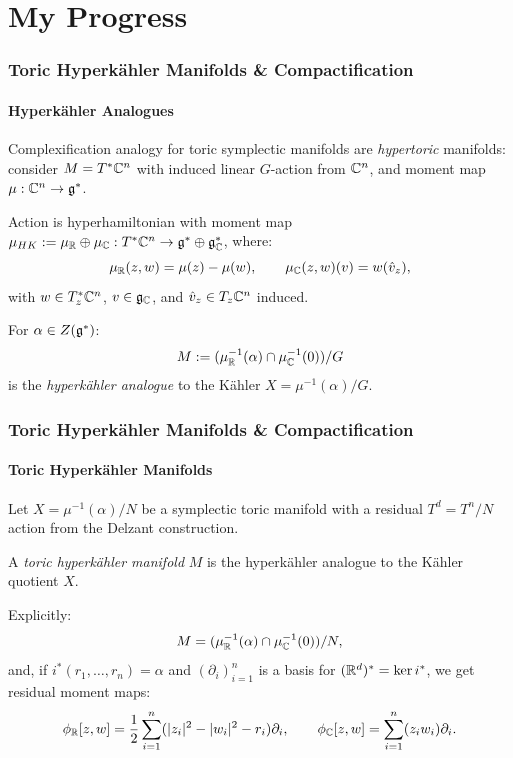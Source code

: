 \section[]{My Progress}

\begin{frame}
\frametitle{Toric Hyperk{\"a}hler Manifolds \& Compactification}
\framesubtitle{Hyperk{\"a}hler Analogues}

Complexification analogy for toric symplectic manifolds are \emph{hypertoric} manifolds: consider $M = T^{\ast}\mathbb{C}^{n}$ with induced linear $G$-action from $\mathbb{C}^{n}$, and moment map $\mu:\mathbb{C}^{n} \rightarrow \mathfrak{g}^{\ast}$.

Action is hyperhamiltonian with \HK moment map $\mu_{HK} := \mu_{\mathbb{R}} \oplus \mu_{\mathbb{C}}:T^{\ast}\mathbb{C}^{n} \rightarrow \mathfrak{g}^{\ast} \oplus \mathfrak{g}_{\mathbb{C}}^{\ast}$, where:
$$
	\mu_{\mathbb{R}}(z,w) = \mu(z) - \mu(w),\qquad \mu_{\mathbb{C}}(z,w)(v) =w(\hat{v}_{z}),
$$
with $w\in T_{z}^{\ast}\mathbb{C}^{n}$, $v \in \mathfrak{g}_{\mathbb{C}}$, and $\hat{v}_{z} \in T_{z}\mathbb{C}^{n}$ induced.
\begin{defn}
	For $\alpha \in Z(\mathfrak{g}^{\ast})$:
	$$
		M := (\mu_{\mathbb{R}}^{-1}(\alpha)\cap \mu_{\mathbb{C}}^{-1}(0))/G
	$$
	is the \emph{hyperk{\"a}hler analogue} to the K{\"a}hler $X = \mu^{-1}(\alpha)/G$.
\end{defn}

\end{frame}

\begin{frame}
	\frametitle{Toric Hyperk{\"a}hler Manifolds \& Compactification}
	\framesubtitle{Toric Hyperk{\"a}hler Manifolds}
	
	Let $X = \mu^{-1}(\alpha)/N$ be a symplectic toric manifold with a residual $T^{d} = T^{n}/N$ action from the Delzant construction.
	\begin{defn}
		A \emph{toric hyperk{\"a}hler manifold} $M$ is the hyperk{\"a}hler analogue to the K{\"a}hler quotient $X$.
	\end{defn}
	Explicitly:
	$$
		M = (\mu_{\mathbb{R}}^{-1}(\alpha) \cap \mu_{\mathbb{C}}^{-1}(0))/N,
	$$
	and, if $i^{\ast}(r_{1},\ldots, r_{n}) = \alpha$ and $(\partial_{i})_{i=1}^{n}$ is a basis for $(\mathbb{R}^{d})^{\ast} = \ker i^{\ast}$, we get residual moment maps:
	$$
		\phi_{\mathbb{R}}[z,w] = \frac{1}{2}\sum_{i=1}^{n}(|z_{i}|^{2} - |w_{i}|^{2} - r_{i})\partial_{i},\qquad \phi_{\mathbb{C}}[z,w] = \sum_{i=1}^{n}(z_{i}w_{i})\partial_{i}.
	$$
\end{frame}

